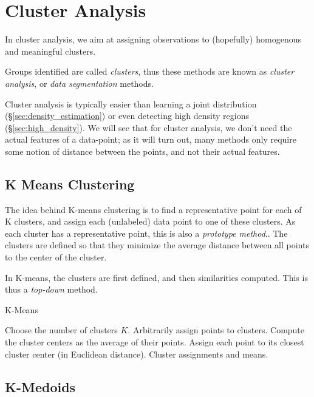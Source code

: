 \section{Cluster Analysis}
\label{sec:cluster_analysis}

In cluster analysis, we aim at assigning observations to (hopefully) homogenous and meaningful clusters. 

Groups identified are called \emph{clusters}, thus these methods are known as \emph{cluster analysis}, or \emph{data segmentation} methods.

Cluster analysis is typically easier than learning a joint distribution (\S\ref{sec:density_estimation}) or even detecting high density regions (\S\ref{sec:high_density}). We will see that for cluster analysis, we don't need the actual features of a data-point; as it will turn out, many methods only require some notion of distance between the points, and not their actual features. 



\subsection{K Means Clustering}
\label{sec:kmeans}
The idea behind K-means clustering is to find a representative point for each of K clusters, and assign each (unlabeled) data point to one of these clusters. As each cluster has a representative point, this is also a \emph{prototype method}..
The clusters are defined so that they minimize the average distance between all points to the center of the cluster.

In K-means, the clusters are first defined, and then similarities computed. This is thus a \emph{top-down} method.

\begin{algorithm}[H]
\caption{K-Means}
\begin{algorithmic}
\State Choose the number of clusters $K$.
\State Arbitrarily assign points to clusters.
	\State Compute the cluster centers as the average of their points.
	\State Assign each point to its closest cluster center (in Euclidean distance).
\EndWhile
\State \Return Cluster assignments and means.
\end{algorithmic}
\end{algorithm}





\subsection{K-Medoids}
\label{sec:k_medoids}


